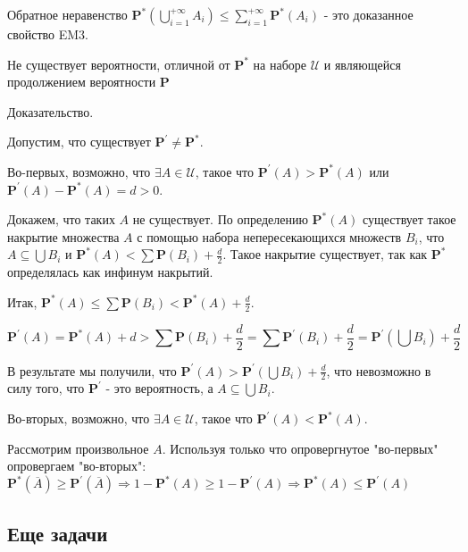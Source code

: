 {Обратное неравенство $\mathbf{P^{*}}(\bigcup_{i=1}^{+\infty}
A_{i})\leq \sum_{i=1}^{+\infty}\mathbf{P^{*}}(A_{i})$ - это
доказанное свойство EM3.


\begin{myth}
Не существует вероятности, отличной от $\mathbf{P^{*}}$ на наборе
$\mathcal{U}$ и являющейся продолжением вероятности $\mathbf{P}$
\end{myth}

Доказательство.

Допустим, что существует $\mathbf{P^{'}}\neq \mathbf{P^{*}}$.

Во-первых, возможно, что $\exists A\in\mathcal{U}$, такое что
$\mathbf{P^{'}}(A)> \mathbf{P^{*}}(A)$ или
$\mathbf{P^{'}}(A)-\mathbf{P^{*}}(A)=d>0$.

Докажем, что таких $A$ не существует. По определению
$\mathbf{P^{*}}(A)$ существует такое накрытие множества $A$ с
помощью набора непересекающихся множеств $B_{i}$, что
$A\subseteq\bigcup B_{i}$ и $\mathbf{P^{*}}(A)<\sum
\mathbf{P}(B_{i})+\frac{d}{2}$. Такое накрытие существует, так как
$\mathbf{P^{*}}$ определялась как инфинум накрытий.

Итак, $\mathbf{P^{*}}(A)\leq \sum
\mathbf{P}(B_{i})<\mathbf{P^{*}}(A)+\frac{d}{2}$.

$$
\mathbf{P^{'}}(A)=\mathbf{P^{*}}(A)+d>\sum
\mathbf{P}(B_{i})+\frac{d}{2}=\sum
\mathbf{P^{'}}(B_{i})+\frac{d}{2}=\mathbf{P^{'}}(\bigcup
B_{i})+\frac{d}{2}
$$

В результате мы получили, что
$\mathbf{P^{'}}(A)>\mathbf{P^{'}}(\bigcup B_{i})+\frac{d}{2}$, что
невозможно в силу того, что $\mathbf{P^{'}}$ - это вероятность, а
$A\subseteq\bigcup B_{i}$.

Во-вторых, возможно, что $\exists A\in\mathcal{U}$, такое что
$\mathbf{P^{'}}(A)< \mathbf{P^{*}}(A)$.

Рассмотрим произвольное $A$. Используя только что опровергнутое
"во-первых" опровергаем "во-вторых":
$\mathbf{P^{*}}(\overline{A})\geq\mathbf{P^{'}}(\overline{A})
\Rightarrow 1-\mathbf{P^{*}}(A)\geq 1-\mathbf{P^{'}}(A)
\Rightarrow \mathbf{P^{*}}(A)\leq \mathbf{P^{'}}(A)$



}\subsection{Еще задачи}








